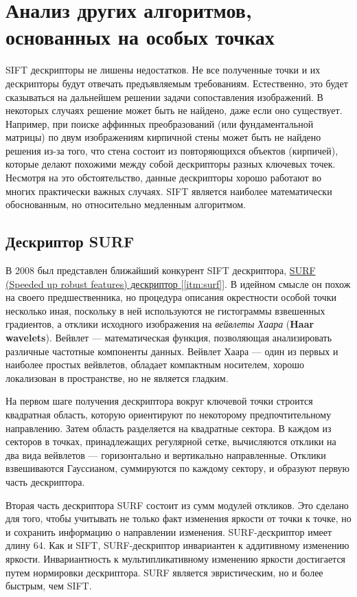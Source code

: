 \section{Анализ других алгоритмов, основанных на особых точках}

SIFT дескрипторы не лишены недостатков. Не все полученные точки и их дескрипторы будут отвечать предъявляемым требованиям. Естественно, это будет сказываться на дальнейшем решении задачи сопоставления изображений. В некоторых случаях решение может быть не найдено, даже если оно существует. Например, при поиске аффинных преобразований (или фундаментальной матрицы) по двум изображениям кирпичной стены может быть не найдено решения из-за того, что стена состоит из повторяющихся объектов (кирпичей), которые делают похожими между собой дескрипторы разных ключевых точек. Несмотря на это обстоятельство, данные дескрипторы хорошо работают во многих практически важных случаях. SIFT является наиболее математически обоснованным, но относительно медленным алгоритмом.

\subsection{Дескриптор SURF}

В 2008 был представлен ближайший конкурент SIFT дескриптора, \hyperref[itm:surf]{ SURF (Speeded up robust features) дескриптор [\ref{itm:surf}]}. В идейном смысле он похож на своего предшественника, но процедура описания окрестности особой точки несколько иная, поскольку в ней используются не гистограммы взвешенных градиентов, а отклики исходного изображения на \textit{вейвлеты Хаара} (\textbf{Haar wavelets}). Вейвлет — математическая функция, позволяющая анализировать различные частотные компоненты данных. Вейвлет Хаара — один из первых и наиболее простых вейвлетов, обладает компактным носителем, хорошо локализован в пространстве, но не является гладким.

На первом шаге получения дескриптора вокруг ключевой точки строится квадратная область, которую ориентируют по некоторому предпочтительному направлению. Затем область разделяется на квадратные сектора. В каждом из секторов в точках, принадлежащих регулярной сетке, вычисляются отклики на два вида вейвлетов — горизонтально и вертикально направленные. Отклики взвешиваются Гауссианом, суммируются по каждому сектору, и образуют первую часть дескриптора.

Вторая часть дескриптора SURF состоит из сумм модулей откликов. Это сделано для того, чтобы учитывать не только факт изменения яркости от точки к точке, но и сохранить информацию о направлении изменения. SURF-дескриптор имеет длину 64. Как и SIFT, SURF-дескриптор инвариантен к аддитивному изменению яркости. Инвариантность к мультипликативному изменению яркости достигается путем нормировки дескриптора. SURF является эвристическим, но и более быстрым, чем SIFT.

